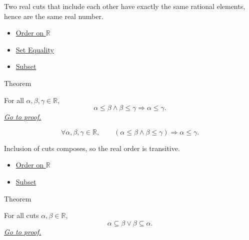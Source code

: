 \begin{remark*}[Interpretation]
Two real cuts that include each other have exactly the same rational elements, hence are the same real number.
\end{remark*}

\begin{dependencies}
\begin{itemize}
  \item \hyperref[def:order-on-r]{Order on $\mathbb{R}$}
  \item \hyperref[def:set-equality]{Set Equality}
  \item \hyperref[def:subset]{Subset}
\end{itemize}
\end{dependencies}

\begin{theorembox}{Theorem}
\begin{theorem}
\label{thm:order-on-r-transitive}
For all $\alpha,\beta,\gamma\in\mathbb{R}$,
\[
\alpha\le\beta\land\beta\le\gamma \Longrightarrow \alpha\le\gamma.
\]
\hyperref[prf:order-on-r-transitive]{\textit{Go to proof.}}
\end{theorem}
\end{theorembox}

\begin{remark*}
\[
\forall \alpha,\beta,\gamma\in\mathbb{R},\qquad
(\alpha\le\beta\land\beta\le\gamma)\Longrightarrow \alpha\le\gamma.
\]
\end{remark*}

\begin{remark*}[Interpretation]
Inclusion of cuts composes, so the real order is transitive.
\end{remark*}

\begin{dependencies}
\begin{itemize}
  \item \hyperref[def:order-on-r]{Order on $\mathbb{R}$}
  \item \hyperref[def:subset]{Subset}
\end{itemize}
\end{dependencies}

\begin{theorembox}{Theorem}
\begin{theorem}
\label{thm:comparability-of-cuts}
For all cuts $\alpha,\beta\in\mathbb{R}$,
\[
\alpha\subseteq\beta \lor \beta\subseteq\alpha.
\]
\hyperref[prf:comparability-of-cuts]{\textit{Go to proof.}}
\end{theorem}
\end{theorembox}

